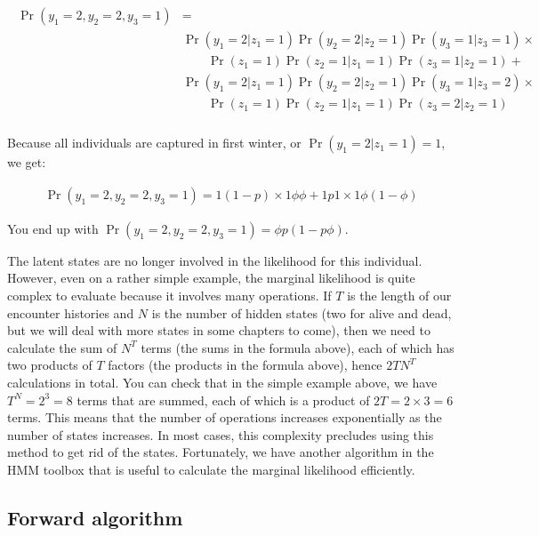 \documentclass[
  12pt,
]{krantz}
\begin{document}
\begin{align*}
\begin{split}
\Pr(y_1 = 2, y_2 = 2, y_3 = 1) &= \\
& \Pr(y_1 = 2 | z_1 = 1) \Pr(y_2 = 2 | z_2 = 1) \Pr(y_3 = 1 | z_3 = 1) \times \\ 
& \qquad \Pr(z_1 = 1) \Pr(z_2 = 1 | z_1 = 1) \Pr(z_3 = 1 | z_2 = 1) +\\
&  \Pr(y_1 = 2 | z_1 = 1) \Pr(y_2 = 2 | z_2 = 1) \Pr(y_3 = 1 | z_3 = 2) \times\\ 
& \qquad \Pr(z_1 = 1) \Pr(z_2 = 1 | z_1 = 1) \Pr(z_3 = 2 | z_2 = 1)\\
\end{split}
\end{align*}

Because all individuals are captured in first winter, or \(\Pr(y_1 = 2 | z_1 = 1) = 1\), we get:

\begin{align*}
\Pr(y_1 = 2, y_2 = 2, y_3 = 1) =  1 (1-p) \times 1 \phi \phi + 1 p 1 \times 1 \phi (1-\phi)
\end{align*}

You end up with \(\Pr(y_1 = 2, y_2 = 2, y_3 = 1) = \phi p (1 - p\phi)\).

The latent states are no longer involved in the likelihood for this individual. However, even on a rather simple example, the marginal likelihood is quite complex to evaluate because it involves many operations. If \(T\) is the length of our encounter histories and \(N\) is the number of hidden states (two for alive and dead, but we will deal with more states in some chapters to come), then we need to calculate the sum of \(N^T\) terms (the sums in the formula above), each of which has two products of \(T\) factors (the products in the formula above), hence \(2TN^T\) calculations in total. You can check that in the simple example above, we have \(T^N = 2^3 = 8\) terms that are summed, each of which is a product of \(2T = 2 \times 3 = 6\) terms. This means that the number of operations increases exponentially as the number of states increases. In most cases, this complexity precludes using this method to get rid of the states. Fortunately, we have another algorithm in the HMM toolbox that is useful to calculate the marginal likelihood efficiently.

\subsection{Forward algorithm}\label{forward-algorithm}
\end{document}
